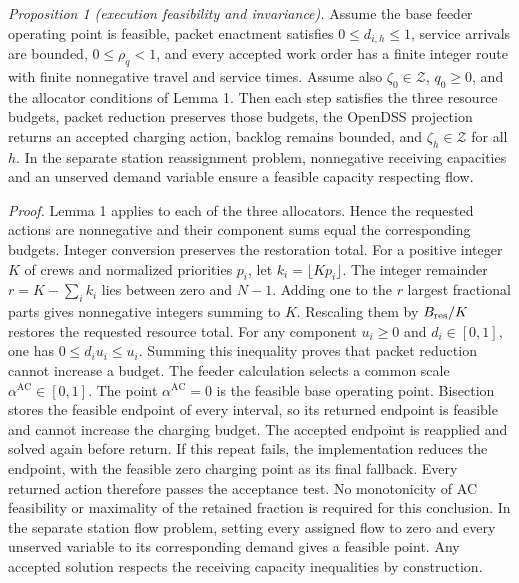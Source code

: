 \documentclass[journal]{IEEEtran}
\begin{document}
\textit{Proposition 1 (execution feasibility and invariance).}  Assume
the base feeder operating point is feasible, packet enactment satisfies
$0\le d_{i,h}\le1$, service arrivals are bounded, $0\le\rho_q<1$, and every
accepted work order has a finite integer route with finite nonnegative travel
and service times.  Assume also $\zeta_0\in\mathcal Z$, $q_0\ge0$, and the
allocator conditions of Lemma 1.  Then each step satisfies the three resource
budgets, packet reduction preserves those budgets, the OpenDSS projection
returns an accepted charging action, backlog remains bounded, and
$\zeta_h\in\mathcal Z$ for all $h$.  In the separate station reassignment
problem, nonnegative receiving capacities and an unserved demand variable
ensure a feasible capacity respecting flow.

\textit{Proof.}  Lemma 1 applies to each of the three allocators.  Hence the
requested actions are nonnegative and their component sums equal the
corresponding budgets.  Integer conversion preserves the restoration total.
For a positive integer $K$ of crews and normalized priorities $p_i$, let $k_i=\lfloor Kp_i\rfloor$.
The integer remainder $r=K-\sum_i k_i$ lies between zero and $N-1$.
Adding one to the $r$ largest fractional parts gives nonnegative integers
summing to $K$.  Rescaling them by $B_{\rm res}/K$ restores the requested
resource total.  For any component $u_i\ge0$ and $d_i\in[0,1]$, one has
$0\le d_i u_i\le u_i$.  Summing this inequality proves that packet reduction
cannot increase a budget.  The feeder calculation selects a common scale
$\alpha^{\mathrm{AC}}\in[0,1]$.  The point $\alpha^{\mathrm{AC}}=0$ is the
feasible base operating point.  Bisection stores the feasible endpoint of every
interval, so its returned endpoint is feasible and cannot increase the charging
budget.  The accepted endpoint is reapplied and solved again before return.
If this repeat fails, the implementation reduces the endpoint, with the
feasible zero charging point as its final fallback.  Every returned action
therefore passes the acceptance test.  No monotonicity of AC feasibility or
maximality of the retained fraction is required for this conclusion.
In the separate station flow problem, setting every assigned flow to zero and
every unserved variable to its corresponding demand gives a feasible point.
Any accepted solution respects the receiving capacity inequalities by
construction.
\end{document}
